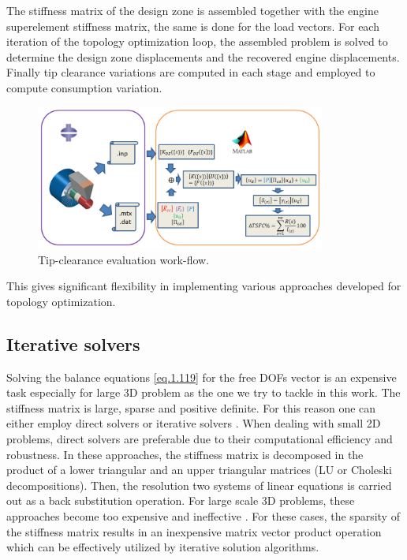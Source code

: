 The stiffness matrix of the design zone is assembled together with the engine superelement stiffness matrix, the same is done for the load vectors. For each iteration of the topology optimization loop, the assembled problem is solved to determine the design zone displacements and the recovered engine displacements.  Finally tip clearance variations are computed in each stage and employed to compute consumption variation.
\begin{figure}[hbt!]
\centering
\includegraphics[width=0.85\textwidth]{images/Ch1/tip_cl_wkf.png}
\caption{Tip-clearance evaluation work-flow. 
\label{f.6b}}
\end{figure}
 This gives significant flexibility in implementing various approaches developed for topology optimization.
\subsection{Iterative solvers}
\label{subsection1.4.2}
Solving the balance equations \ref{eq.1.119} for the free DOFs vector is an expensive task especially for large 3D problem as the one we try to tackle in this work. The stiffness matrix is large, sparse and positive definite. For this reason one can either employ direct solvers \cite{davis2006direct} or
iterative solvers \cite{saad2003iterative}. When dealing with small 2D problems, direct solvers are preferable due to their computational efficiency and robustness. In these approaches, the stiffness matrix is decomposed in the product of a lower triangular and an upper triangular matrices (LU or Choleski decompositions). Then, the resolution two systems of linear equations is carried out as a back substitution operation. For large scale 3D problems, these approaches become too expensive and ineffective \cite{davis2006direct}. For these cases, the sparsity of the stiffness matrix results in an inexpensive matrix vector product operation which can be effectively utilized by iterative solution algorithms.
